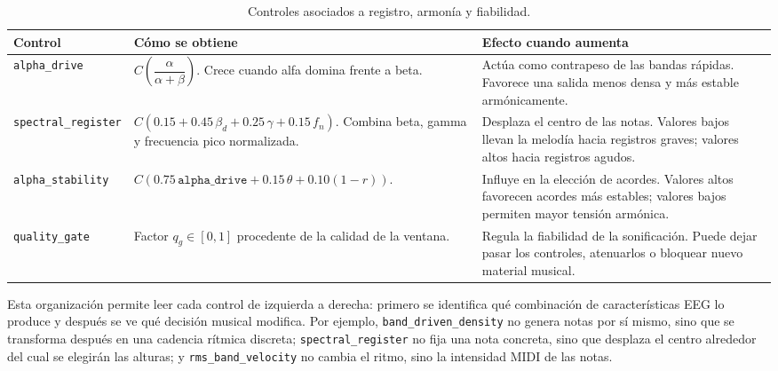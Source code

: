 \documentclass[../main.tex]{subfiles}
\begin{document}
\begin{table}[H]
    \centering
    \caption{Controles asociados a registro, armonía y fiabilidad.}
    \label{tab:impl_sonificacion_controles_melodicos}
    \footnotesize
    \setlength{\tabcolsep}{3pt}
    \renewcommand{\arraystretch}{1.10}
    \begin{tabular}{p{}p{}p{}}
        \hline
        \textbf{Control} & \textbf{Cómo se obtiene} & \textbf{Efecto cuando aumenta} \\
        \hline

        \texttt{alpha\_drive} &
        \(C\left(\dfrac{\alpha}{\alpha+\beta}\right)\). Crece cuando alfa domina frente a beta. &
        Actúa como contrapeso de las bandas rápidas. Favorece una salida menos densa y más estable armónicamente. \\

        \texttt{spectral\_register} &
        \(C(0.15 + 0.45\,\beta_d + 0.25\,\gamma + 0.15\,f_n)\). Combina beta, gamma y frecuencia pico normalizada. &
        Desplaza el centro de las notas. Valores bajos llevan la melodía hacia registros graves; valores altos hacia registros agudos. \\

        \texttt{alpha\_stability} &
        \(C(0.75\,\texttt{alpha\_drive} + 0.15\,\theta + 0.10(1-r))\). &
        Influye en la elección de acordes. Valores altos favorecen acordes más estables; valores bajos permiten mayor tensión armónica. \\

        \texttt{quality\_gate} &
        Factor \(q_g \in [0,1]\) procedente de la calidad de la ventana. &
        Regula la fiabilidad de la sonificación. Puede dejar pasar los controles, atenuarlos o bloquear nuevo material musical. \\
        \hline
    \end{tabular}
\end{table}

Esta organización permite leer cada control de izquierda a derecha: primero se identifica qué combinación de características EEG lo produce y después se ve qué decisión musical modifica. Por ejemplo, \texttt{band\_driven\_density} no genera notas por sí mismo, sino que se transforma después en una cadencia rítmica discreta; \texttt{spectral\_register} no fija una nota concreta, sino que desplaza el centro alrededor del cual se elegirán las alturas; y \texttt{rms\_band\_velocity} no cambia el ritmo, sino la intensidad MIDI de las notas.
\end{document}
